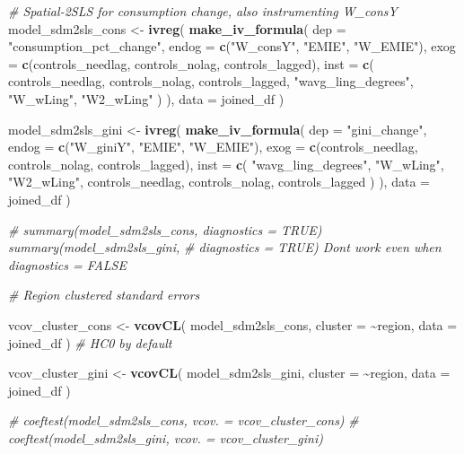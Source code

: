 \documentclass[
]{article}
\newenvironment{Shaded}{\begin{snugshade}}{\end{snugshade}}
\newcommand{\AttributeTok}[1]{\textcolor[rgb]{0.13,0.29,0.53}{#1}}
\newcommand{\CommentTok}[1]{\textcolor[rgb]{0.56,0.35,0.01}{\textit{#1}}}
\newcommand{\FunctionTok}[1]{\textcolor[rgb]{0.13,0.29,0.53}{\textbf{#1}}}
\newcommand{\NormalTok}[1]{#1}
\newcommand{\OtherTok}[1]{\textcolor[rgb]{0.56,0.35,0.01}{#1}}
\newcommand{\SpecialCharTok}[1]{\textcolor[rgb]{0.81,0.36,0.00}{\textbf{#1}}}
\newcommand{\StringTok}[1]{\textcolor[rgb]{0.31,0.60,0.02}{#1}}
\begin{document}
\begin{Shaded}
\begin{Highlighting}[]
\CommentTok{\# Spatial{-}2SLS for consumption change, also instrumenting W\_consY}
\NormalTok{model\_sdm2sls\_cons }\OtherTok{\textless{}{-}} \FunctionTok{ivreg}\NormalTok{(}
    \FunctionTok{make\_iv\_formula}\NormalTok{(}
        \AttributeTok{dep =} \StringTok{"consumption\_pct\_change"}\NormalTok{, }\AttributeTok{endog =} \FunctionTok{c}\NormalTok{(}\StringTok{"W\_consY"}\NormalTok{, }\StringTok{"EMIE"}\NormalTok{, }\StringTok{"W\_EMIE"}\NormalTok{),}
        \AttributeTok{exog =} \FunctionTok{c}\NormalTok{(controls\_needlag, controls\_nolag, controls\_lagged),}
        \AttributeTok{inst =} \FunctionTok{c}\NormalTok{(}
\NormalTok{            controls\_needlag, controls\_nolag, controls\_lagged,}
            \StringTok{"wavg\_ling\_degrees"}\NormalTok{, }\StringTok{"W\_wLing"}\NormalTok{, }\StringTok{"W2\_wLing"}
\NormalTok{        )}
\NormalTok{    ),}
    \AttributeTok{data =}\NormalTok{ joined\_df}
\NormalTok{)}

\NormalTok{model\_sdm2sls\_gini }\OtherTok{\textless{}{-}} \FunctionTok{ivreg}\NormalTok{(}
    \FunctionTok{make\_iv\_formula}\NormalTok{(}
        \AttributeTok{dep =} \StringTok{"gini\_change"}\NormalTok{, }\AttributeTok{endog =} \FunctionTok{c}\NormalTok{(}\StringTok{"W\_giniY"}\NormalTok{, }\StringTok{"EMIE"}\NormalTok{, }\StringTok{"W\_EMIE"}\NormalTok{),}
        \AttributeTok{exog =} \FunctionTok{c}\NormalTok{(controls\_needlag, controls\_nolag, controls\_lagged),}
        \AttributeTok{inst =} \FunctionTok{c}\NormalTok{(}
            \StringTok{"wavg\_ling\_degrees"}\NormalTok{, }\StringTok{"W\_wLing"}\NormalTok{, }\StringTok{"W2\_wLing"}\NormalTok{, controls\_needlag,}
\NormalTok{            controls\_nolag, controls\_lagged}
\NormalTok{        )}
\NormalTok{    ),}
    \AttributeTok{data =}\NormalTok{ joined\_df}
\NormalTok{)}

\CommentTok{\# summary(model\_sdm2sls\_cons, diagnostics = TRUE) summary(model\_sdm2sls\_gini,}
\CommentTok{\# diagnostics = TRUE) Don\textquotesingle{}t work even when diagnostics = FALSE}



\CommentTok{\# Region clustered standard errors}

\NormalTok{vcov\_cluster\_cons }\OtherTok{\textless{}{-}} \FunctionTok{vcovCL}\NormalTok{(}
\NormalTok{    model\_sdm2sls\_cons, }\AttributeTok{cluster =} \SpecialCharTok{\textasciitilde{}}\NormalTok{region,}
    \AttributeTok{data =}\NormalTok{ joined\_df}
\NormalTok{)}
\CommentTok{\# HC0 by default}

\NormalTok{vcov\_cluster\_gini }\OtherTok{\textless{}{-}} \FunctionTok{vcovCL}\NormalTok{(}
\NormalTok{    model\_sdm2sls\_gini, }\AttributeTok{cluster =} \SpecialCharTok{\textasciitilde{}}\NormalTok{region,}
    \AttributeTok{data =}\NormalTok{ joined\_df}
\NormalTok{)}


\CommentTok{\# coeftest(model\_sdm2sls\_cons, vcov. = vcov\_cluster\_cons)}
\CommentTok{\# coeftest(model\_sdm2sls\_gini, vcov. = vcov\_cluster\_gini)}
\end{Highlighting}
\end{Shaded}
\end{document}
